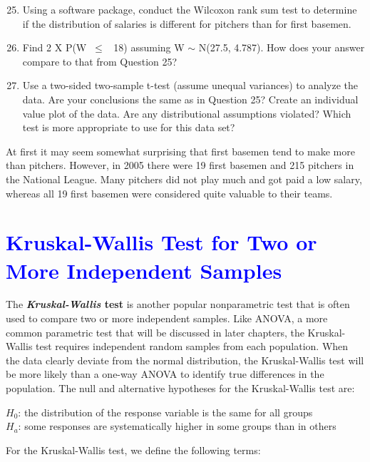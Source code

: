 \documentclass[
]{report}
\begin{document}
\begin{enumerate}
 \setcounter{enumi}{24}
 \item Using a software package, conduct the Wilcoxon rank sum test to determine if the distribution of salaries is different for pitchers than for first basemen.
 \item Find 2 X P(W $\scriptstyle \ \leq$ \ 18) assuming W $\sim$ N(27.5, 4.787). How does your answer compare to that from Question 25?
 \item Use a two-sided two-sample t-test (assume unequal variances) to analyze the data. Are your conclusions the same as in Question 25? Create an individual value plot of the data. Are any distributional assumptions violated? Which test is more appropriate to use for this data set?
\end{enumerate}

At first it may seem somewhat surprising that first basemen tend to make more than pitchers. However, in 2005 there were 19 first basemen and 215 pitchers in the National League. Many pitchers did not play much and got paid a low salary, whereas all 19 first basemen were considered quite valuable to their teams.

\hypertarget{section-11}{%
\section{\texorpdfstring{\textcolor{blue}{Kruskal-Wallis Test for Two or More Independent Samples}}{}}\label{section-11}}

The \textbf{\emph{Kruskal-Wallis} test} is another popular nonparametric test that is often used to compare two or more independent samples. Like ANOVA, a more common parametric test that will be discussed in later chapters, the Kruskal-Wallis test requires independent random samples from each population. When the data clearly deviate from the normal distribution, the Kruskal-Wallis test will be more likely than a one-way ANOVA to identify true differences in the population. The null and alternative hypotheses for the Kruskal-Wallis test are:

\begin{center}
$H_0$: the distribution of the response variable is the same for all groups\\
$H_a$: some responses are systematically higher in some groups than in others
\end{center}

For the Kruskal-Wallis test, we define the following terms:
\end{document}
